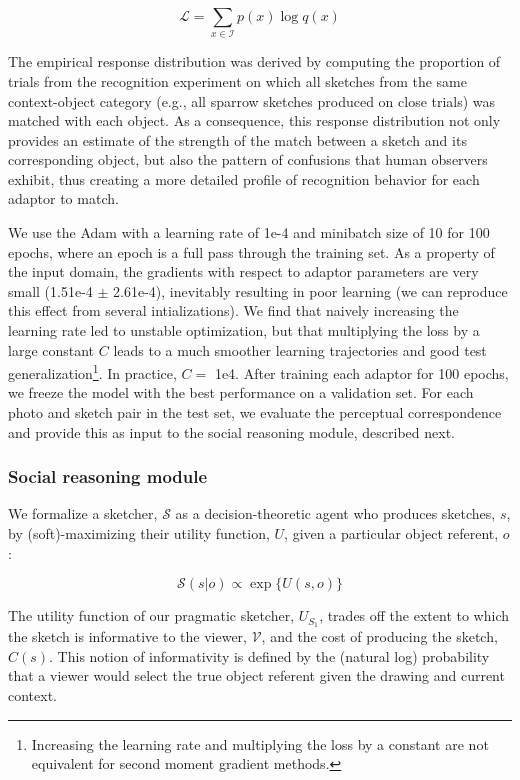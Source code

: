 \documentclass[9pt,twocolumn,twoside]{pnas-new}
\begin{document}
{\begin{equation}
    \mathcal{L} = \sum_{x \in \mathcal{I}} p(x)\log q(x)
    \label{eqn:cross_entropy}
\end{equation}

The empirical response distribution was derived by computing the proportion of trials from the recognition experiment on which all sketches from the same context-object category (e.g., all sparrow sketches produced on close trials) was matched with each object. As a consequence, this response distribution not only provides an estimate of the strength of the match between a sketch and its corresponding object, but also the pattern of confusions that human observers exhibit, thus creating a more detailed profile of recognition behavior for each adaptor to match.

We use the Adam \cite[]{kingma2014adam} with a learning rate of 1e-4 and minibatch size of 10 for 100 epochs, where an epoch is a full pass through the training set. As a property of the input domain, the gradients with respect to adaptor parameters are very small (1.51e-4 $\pm$ 2.61e-4), inevitably resulting in poor learning (we can reproduce this effect from several intializations). We find that naively increasing the learning rate led to unstable optimization, but that multiplying the loss by a large constant $C$ leads to a much smoother learning trajectories and good test generalization\footnote{Increasing the learning rate and multiplying the loss by a constant are not equivalent for second moment gradient methods.}. In practice, $C =$ 1e4. After training each adaptor for 100 epochs, we freeze the model with the best performance on a validation set. For each photo and sketch pair in the test set, we evaluate the perceptual correspondence and provide this as input to the social reasoning module, described next.

\subsubsection*{Social reasoning module}

We formalize a sketcher, $\mathcal{S}$ as a decision-theoretic agent who produces sketches, $s$, by (soft)-maximizing their utility function, $U$, given a particular object referent, $o$:

\begin{equation}
\mathcal{S}(s|o) \propto \exp\{{U(s,o)\}}
\end{equation}

The utility function of our pragmatic sketcher, $U_{S_1}$,  trades off the extent to which the sketch is informative to the viewer, $\mathcal{V}$, and the cost of producing the sketch, $C(s)$. This notion of informativity is defined by the (natural log) probability that a viewer would select the true object referent given the drawing and current context.

}
\end{document}

